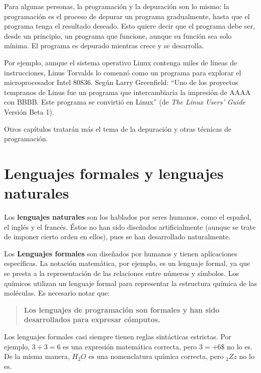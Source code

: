 
Para algunas personas, la programación y la depuración son lo
mismo: la programación es el proceso de depurar un programa
gradualmente, hasta que el programa tenga el resultado deseado.
Esto quiere decir que el programa debe ser, desde un principio, un
programa que funcione, aunque su función sea solo mínima. El
programa es depurado mientras crece y se desarrolla.

Por ejemplo, aunque el sistema operativo Linux contenga miles de
líneas de instrucciones, Linus Torvalds lo comenzó como un
programa para explorar el microprocesador Intel 80836. Según Larry
Greenfield: ``Uno de los proyectos tempranos de Linus fue un
programa que intercambiaría la impresión de AAAA con BBBB. Este
programa se convirtió en Linux'' (de {\em The Linux Users' Guide}
Versión Beta 1).


Otros capítulos tratarán más  el tema de la depuración y otras técnicas
de programación.

\section{Lenguajes formales y lenguajes naturales}

Los {\bf lenguajes naturales} son los hablados por seres
humanos, como el español, el inglés y el francés. Éstos no han sido
diseñados artificialmente (aunque se trate de imponer cierto orden en
ellos), pues se han desarrollado naturalmente.

Los {\bf Lenguajes formales}  son diseñados por
humanos y tienen aplicaciones específicas. La notación
matemática, por ejemplo, es un lenguaje formal, ya que se presta a
la representación de las relaciones entre números y símbolos. Los
químicos utilizan un lenguaje formal para representar la
estructura química de las moléculas. Es necesario notar que:

\begin{quote}
{\bf Los lenguajes de programación son formales y han sido
desarrollados para expresar cómputos.}
\end{quote}

Los lenguajes formales casi siempre tienen reglas sintácticas 
estrictas.
Por ejemplo, $3+3=6$ es una expresión matemática correcta, pero
$3=+6\$$ no lo es. De la misma manera, $H_2O$ es una nomenclatura
química correcta, pero $_2Zz$ no lo es.

